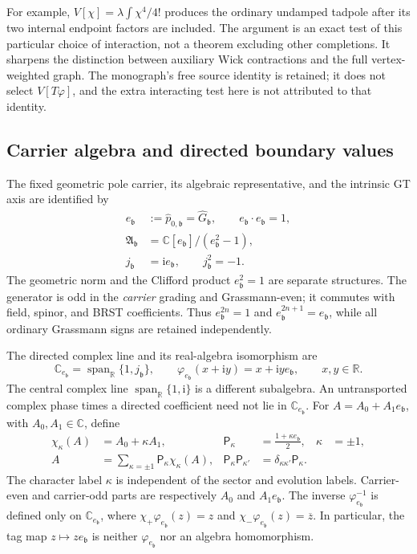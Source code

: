 \documentclass[final,5p,times,twocolumn,numbers,nopreprintline]{elsarticle}
\numberwithin{equation}{section}
\theoremstyle{definition}
\theoremstyle{remark}
\newcommand{\ii}{\mathrm i}
\newcommand{\bb}{\mathfrak b}
\newcommand{\RR}{\mathbb R}
\newcommand{\CC}{\mathbb C}
\newcommand{\ee}{e_{\bb}}
\newcommand{\je}{j_{\bb}}
\newcommand{\embed}{\varphi_{\ee}}
\begin{document}
For example, \(V[\chi]=\lambda\int\chi^4/4!\) produces the
ordinary undamped tadpole after its two internal endpoint factors
are included. The argument is an exact test of this particular
choice of interaction, not a theorem excluding other completions.
It sharpens the distinction between auxiliary Wick contractions and
the full vertex-weighted graph. The monograph's free source identity
is retained; it does not select \(V[T\varphi]\), and the extra
interacting test here is not attributed to that identity.

\subsection{Carrier algebra and directed boundary values}
\label{sec:carrier}

The fixed geometric pole carrier, its algebraic representative, and
the intrinsic GT axis are identified by
\begin{equation}
\begin{aligned}
 \ee&:=\hat p_{0,\bb}=\hat G_{\bb},\qquad \ee\!\cdot\!\ee=1,\\
 \mathfrak A_{\bb}&=\CC[\ee]/(\ee^2-1),\\
 \je&=\ii\ee,\qquad\je^2=-1.
\end{aligned}
 \label{eq:carrier-algebra}
\end{equation}
The geometric norm and the Clifford product \(\ee^2=1\) are separate
structures. The generator is odd in the \emph{carrier} grading and
Grassmann-even; it commutes with field, spinor, and BRST coefficients.
Thus \(\ee^{2n}=1\) and \(\ee^{2n+1}=\ee\), while all ordinary
Grassmann signs are retained independently.

The directed complex line and its real-algebra isomorphism are
\begin{equation}
 \CC_{\ee}=\operatorname{span}_{\RR}\{1,\je\},\qquad
 \embed(x+\ii y)=x+\ii y\ee,\qquad x,y\in\RR.
 \label{eq:directed-embedding}
\end{equation}
The central complex line \(\operatorname{span}_{\RR}\{1,\ii\}\)
is a different subalgebra. An untransported complex phase times a
directed coefficient need not lie in \(\CC_{\ee}\).
For \(A=A_0+A_1\ee\), with \(A_0,A_1\in\CC\), define
\begin{align}
 \chi_\kappa(A)&=A_0+\kappa A_1,&
 \mathsf P_\kappa&=\frac{1+\kappa\ee}{2},&\kappa&=\pm1,
 \nonumber\\
 A&=\sum_{\kappa=\pm1}\mathsf P_\kappa\chi_\kappa(A),&
 \mathsf P_\kappa\mathsf P_{\kappa'}
   &=\delta_{\kappa\kappa'}\mathsf P_\kappa.
 \label{eq:carrier-characters}
\end{align}
The character label \(\kappa\) is independent of the sector and
evolution labels. Carrier-even and carrier-odd parts are respectively
\(A_0\) and \(A_1\ee\). The inverse \(\embed^{-1}\) is defined
only on \(\CC_{\ee}\), where
\(\chi_+\embed(z)=z\) and \(\chi_-\embed(z)=\overline z\).
In particular, the tag map \(z\mapsto z\ee\) is neither
\(\embed\) nor an algebra homomorphism.
\end{document}
